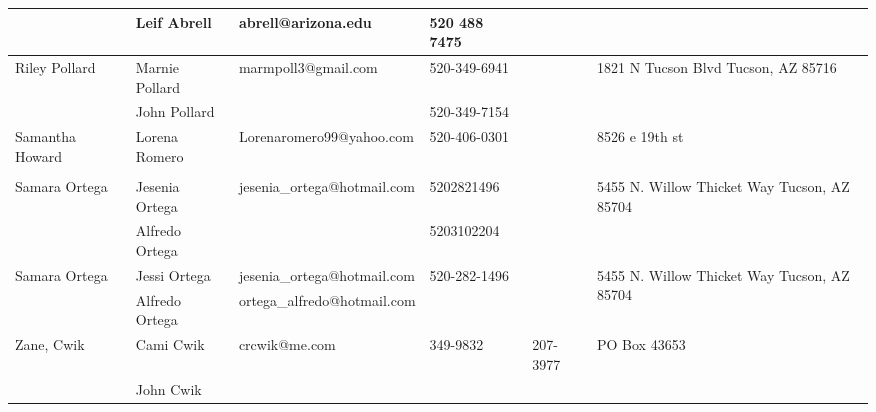 \documentclass[landscape]{article}\usepackage[]{graphicx}\usepackage[]{color}
\begin{document}
\begin{longtable}{|p{100pt}|p{100pt}|p{140pt}|p{60pt}|p{64pt}|p{120pt}|}
 & Leif Abrell & abrell@arizona.edu & 520 488 7475 &  & \\
\hline
\multirow{2}{100pt}{Riley Pollard} & Marnie Pollard & marmpoll3@gmail.com & 520-349-6941 &  & \multirow{2}{120pt}{1821 N Tucson Blvd Tucson, AZ 85716} \\
 & John Pollard &  & 520-349-7154 &  & \\
\hline
\multirow{2}{100pt}{Samantha Howard } & Lorena Romero  & Lorenaromero99@yahoo.com  & 520-406-0301 &  & \multirow{2}{120pt}{8526 e 19th st} \\
 &  &  &  &  & \\
\hline
\multirow{2}{100pt}{Samara Ortega} & Jesenia Ortega & jesenia\_ortega@hotmail.com & 5202821496 &  & \multirow{2}{120pt}{5455 N. Willow Thicket Way Tucson, AZ 85704} \\
 & Alfredo Ortega &  & 5203102204 &  & \\
\hline
\multirow{2}{100pt}{Samara Ortega} & Jessi Ortega & jesenia\_ortega@hotmail.com & 520-282-1496 &  & \multirow{2}{120pt}{5455 N. Willow Thicket Way Tucson, AZ 85704} \\
 & Alfredo Ortega & ortega\_alfredo@hotmail.com &  &  & \\
\hline
\multirow{2}{100pt}{Zane, Cwik} & Cami Cwik & crcwik@me.com & 349-9832 & 207-3977 & \multirow{2}{120pt}{PO Box 43653} \\
 & John Cwik  &  &  &  & \\
\hline
\end{longtable}
\newpage

\hline
\end{document}
